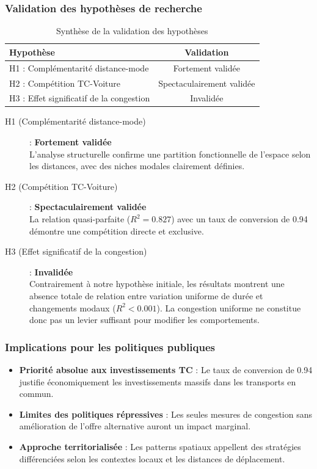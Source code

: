 \documentclass[11pt,a4paper]{article}
\newcommand{\valid}{\textcolor{green!60!black}{\ding{51}}}
\newcommand{\cross}{\textcolor{red!60!black}{\ding{55}}}
\begin{document}
\subsubsection{Validation des hypothèses de recherche}
\begin{table}[H]
    \centering
    \caption{Synthèse de la validation des hypothèses}
    \label{tab:synthese_hypotheses}
    \begin{tabular}{p{} c}
    \toprule
    \textbf{Hypothèse} & \textbf{Validation} \\
    \midrule
    H1 : Complémentarité distance-mode & \valid Fortement validée \\
    H2 : Compétition TC-Voiture & \valid Spectaculairement validée \\
    H3 : Effet significatif de la congestion & \cross Invalidée \\
    \bottomrule
    \end{tabular}
\end{table}
\begin{description}
    \item[H1 (Complémentarité distance-mode)] : \valid \textbf{Fortement validée}\\L'analyse structurelle confirme une partition fonctionnelle de l'espace selon les distances, avec des niches modales clairement définies.
    \item[H2 (Compétition TC-Voiture)] : \valid \textbf{Spectaculairement validée}\\La relation quasi-parfaite ($R^2 = 0.827$) avec un taux de conversion de 0.94 démontre une compétition directe et exclusive.
    \item[H3 (Effet significatif de la congestion)] : \cross \textbf{Invalidée}\\Contrairement à notre hypothèse initiale, les résultats montrent une absence totale de relation entre variation uniforme de durée et changements modaux ($R^2 < 0.001$). La congestion uniforme ne constitue donc pas un levier suffisant pour modifier les comportements.
\end{description}
\subsubsection{Implications pour les politiques publiques}
\begin{itemize}[label=\textbullet]
    \item \textbf{Priorité absolue aux investissements TC} : Le taux de conversion de 0.94 justifie économiquement les investissements massifs dans les transports en commun.
    \item \textbf{Limites des politiques répressives} : Les seules mesures de congestion sans amélioration de l'offre alternative auront un impact marginal.
    \item \textbf{Approche territorialisée} : Les patterns spatiaux appellent des stratégies différenciées selon les contextes locaux et les distances de déplacement.
\end{itemize}
\end{document}
